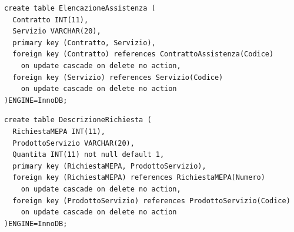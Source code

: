\begin{verbatim}
create table ElencazioneAssistenza (
  Contratto INT(11),
  Servizio VARCHAR(20),
  primary key (Contratto, Servizio),
  foreign key (Contratto) references ContrattoAssistenza(Codice)
    on update cascade on delete no action,
  foreign key (Servizio) references Servizio(Codice)
    on update cascade on delete no action
)ENGINE=InnoDB;
\end{verbatim}
\vspace{0.5cm}

\noindent{}
\newline\newline

\begin{verbatim}
create table DescrizioneRichiesta (
  RichiestaMEPA INT(11),
  ProdottoServizio VARCHAR(20),
  Quantita INT(11) not null default 1,
  primary key (RichiestaMEPA, ProdottoServizio),
  foreign key (RichiestaMEPA) references RichiestaMEPA(Numero)
    on update cascade on delete no action,
  foreign key (ProdottoServizio) references ProdottoServizio(Codice)
    on update cascade on delete no action
)ENGINE=InnoDB;
\end{verbatim}
\vspace{0.5cm}

\noindent{}
\newline\newline

